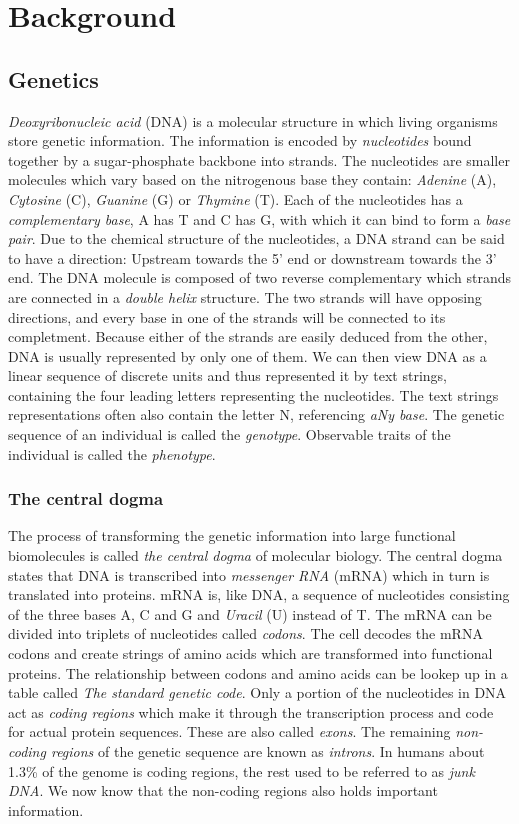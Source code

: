 \documentclass[thesis.tex]{subfiles}
\begin{document}
\chapter{Background}

\section{Genetics}
\textit{Deoxyribonucleic acid} (DNA) is a molecular structure in which living organisms store genetic information. The information is encoded by \textit{nucleotides} bound together by a sugar-phosphate backbone into strands. The nucleotides are smaller molecules which vary based on the nitrogenous base they contain: \textit{Adenine} (A), \textit{Cytosine} (C), \textit{Guanine} (G) or \textit{Thymine} (T). Each of the nucleotides has a \textit{complementary base}, A has T and C has G, with which it can bind to form a \textit{base pair}. Due to the chemical structure of the nucleotides, a DNA strand can be said to have a direction: Upstream towards the 5' end or downstream towards the 3' end. The DNA molecule is composed of two reverse complementary which strands are connected in a \textit{double helix} structure. The two strands will have opposing directions, and every base in one of the strands will be connected to its completment. Because either of the strands are easily deduced from the other, DNA is usually represented by only one of them. We can then view DNA as a linear sequence of discrete units and thus represented it by text strings, containing the four leading letters representing the nucleotides. The text strings representations often also contain the letter N, referencing \textit{aNy base}. The genetic sequence of an individual is called the \textit{genotype}. Observable traits of the individual is called the \textit{phenotype}.
\subsection{The central dogma}
The process of transforming the genetic information into large functional biomolecules is called \textit{the central dogma} of molecular biology. The central dogma states that DNA is transcribed into \textit{messenger RNA} (mRNA) which in turn is translated into proteins. mRNA is, like DNA, a sequence of nucleotides consisting of the three bases A, C and G and \textit{Uracil} (U) instead of T. The mRNA can be divided into triplets of nucleotides called \textit{codons}. The cell decodes the mRNA codons and create strings of amino acids which are transformed into functional proteins. The relationship between codons and amino acids can be lookep up in a table called \textit{The standard genetic code}\cite[Chapter 1, p. 6]{introduction_to_genomics}. Only a portion of the nucleotides in DNA act as \textit{coding regions} which make it through the transcription process and code for actual protein sequences. These are also called \textit{exons}. The remaining \textit{non-coding regions} of the genetic sequence are known as \textit{introns}. In humans about 1.3\% of the genome is coding regions\cite[Chapter 4]{introduction_to_genomics}, the rest used to be referred to as \textit{junk DNA}. We now know that the non-coding regions also holds important information.
\end{document}
